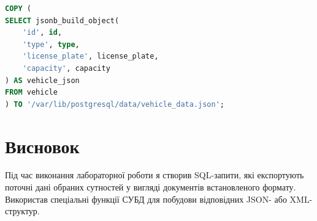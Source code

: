 \documentclass[14pt]{extreport}
\begin{document}
\begin{normalsize}
\begin{lstlisting}[language=sql]
COPY (
SELECT jsonb_build_object(
	'id', id,
	'type', type,
	'license_plate', license_plate,
	'capacity', capacity
) AS vehicle_json
FROM vehicle
) TO '/var/lib/postgresql/data/vehicle_data.json';
	\end{lstlisting}
	
	\section*{Висновок}
	Під час виконання лабораторної роботи я створив SQL-запити, які експортують поточні дані обраних сутностей у вигляді документів встановленого формату. Використав спеціальні функції СУБД для побудови відповідних JSON- або XML-структур. 
	 
\end{normalsize}
\end{document}

